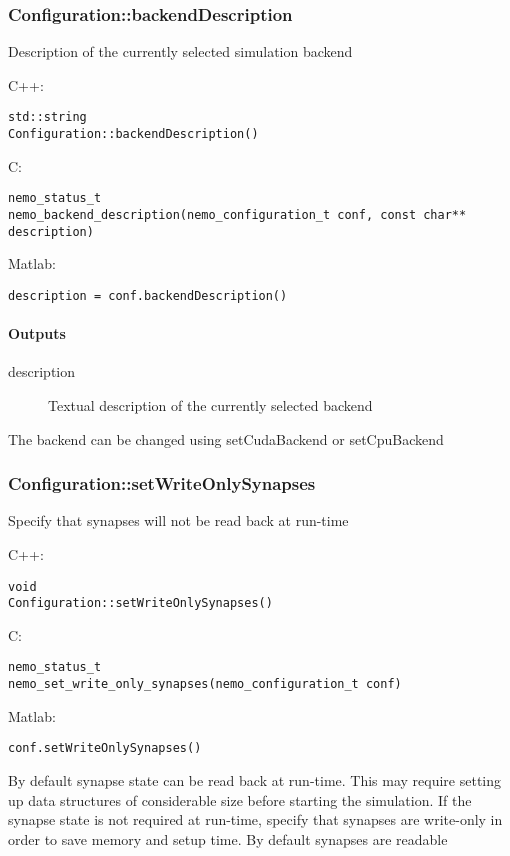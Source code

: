 \clearpage
\subsubsection*{Configuration::backendDescription}
\label{fn: backendDescription}
Description of the currently selected simulation backend


\noindent C++:
\begin{lstlisting}[aboveskip=2pt]
std::string
Configuration::backendDescription()
\end{lstlisting}

\noindent C:
\begin{lstlisting}[aboveskip=2pt]
nemo_status_t
nemo_backend_description(nemo_configuration_t conf, const char** description)
\end{lstlisting}

\noindent Matlab:
\begin{lstlisting}[aboveskip=2pt]
description = conf.backendDescription()
\end{lstlisting}
\paragraph{Outputs}
\begin{description}
\item[description] Textual description of the currently selected backend
\end{description}
The backend can be changed using setCudaBackend or setCpuBackend

\clearpage
\subsubsection*{Configuration::setWriteOnlySynapses}
\label{fn: setWriteOnlySynapses}
Specify that synapses will not be read back at run-time


\noindent C++:
\begin{lstlisting}[aboveskip=2pt]
void
Configuration::setWriteOnlySynapses()
\end{lstlisting}

\noindent C:
\begin{lstlisting}[aboveskip=2pt]
nemo_status_t
nemo_set_write_only_synapses(nemo_configuration_t conf)
\end{lstlisting}

\noindent Matlab:
\begin{lstlisting}[aboveskip=2pt]
conf.setWriteOnlySynapses()
\end{lstlisting}
By default synapse state can be read back at run-time. This may require setting up data structures of considerable size before starting the simulation. If the synapse state is not required at run-time, specify that synapses are write-only in order to save memory and setup time. By default synapses are readable

